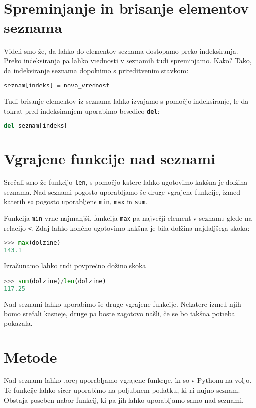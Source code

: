 \section{Spreminjanje in brisanje elementov seznama}

Videli smo že, da lahko do elementov seznama dostopamo preko indeksiranja. Preko indeksiranja pa lahko vrednosti v seznamih tudi spreminjamo. Kako? Tako, da indeksiranje seznama dopolnimo s prireditvenim stavkom:
\begin{lstlisting}[language=Python]
seznam[indeks] = nova_vrednost
\end{lstlisting}

Tudi brisanje elementov iz seznama lahko izvajamo s pomočjo indeksiranje, le da tokrat pred indeksiranjem uporabimo besedico \textbf{\texttt{del}}:
\begin{lstlisting}[language=Python]
del seznam[indeks]
\end{lstlisting}

\section{Vgrajene funkcije nad seznami}
Srečali smo že funkcijo \texttt{len}, s pomočjo katere lahko ugotovimo kakšna je dolžina seznama. Nad seznami pogosto uporabljamo še druge vgrajene funkcije, izmed katerih so pogosto uporabljene \texttt{min}, \texttt{max} in \texttt{sum}.

Funkcija \texttt{min} vrne najmanjši, funkcija \texttt{max} pa največji element v seznamu glede na relacijo \texttt{<}. Zdaj lahko končno ugotovimo kakšna je bila dolžina najdaljšega skoka:
\begin{lstlisting}[language=Python]
>>> max(dolzine)
143.1
\end{lstlisting}

Izračunamo lahko tudi povprečno dožino skoka
\begin{lstlisting}[language=Python]
>>> sum(dolzine)/len(dolzine)
117.25
\end{lstlisting}
Nad seznami lahko uporabimo še druge vgrajene funkcije. Nekatere izmed njih bomo srečali kasneje, druge pa boste zagotovo našli, če se bo takšna potreba pokazala. 

\section{Metode}

Nad seznami lahko torej uporabljamo vgrajene funkcije, ki so v Pythonu na voljo. Te funkcije lahko sicer uporabimo na poljubnem podatku, ki ni nujno seznam. Obstaja poseben nabor funkcij, ki pa jih lahko uporabljamo samo nad seznami. 

